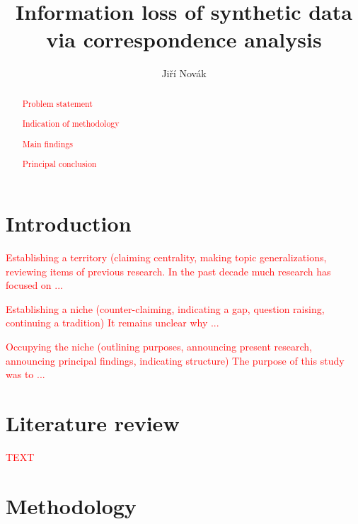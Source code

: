 \documentclass{article}
\title{Information loss of synthetic data via correspondence analysis
}
\author{Jiří Novák
        }
\begin{document}
\maketitle

\begin{abstract}
\textcolor{red}{Problem statement} 

\textcolor{red}{Indication of methodology} 

\textcolor{red}{Main findings} 

\textcolor{red}{Principal conclusion} 
\end{abstract}

\section{Introduction}

\textcolor{red}{Establishing a territory (claiming centrality, making topic generalizations, reviewing items of previous research.} 
\textcolor{red}{In the past decade much research has focused on ...} 

\textcolor{red}{Establishing a niche (counter-claiming, indicating a gap, question raising, continuing a tradition)} 
\textcolor{red}{It remains unclear why ...} 

\textcolor{red}{Occupying the niche (outlining purposes, announcing present research, announcing principal findings, indicating structure)} 
\textcolor{red}{The purpose of this study was to ...} 

\section{Literature review}

\textcolor{red}{TEXT} 

\section{Methodology}
\end{document}
